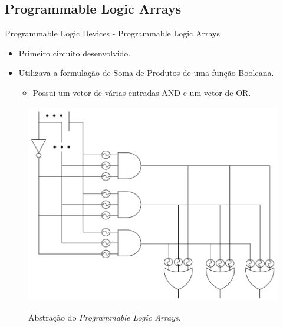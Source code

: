 \documentclass[aspectratio=169]{beamer}
\begin{document}
	\subsection{Programmable Logic Arrays}
	\begin{frame}{Programmable Logic Devices - Programmable Logic Arrays}
		\begin{itemize}
			\item Primeiro circuito desenvolvido.
			\item Utilizava a formulação de Soma de Produtos de uma função Booleana.
			\begin{itemize}
				\item Possui um vetor de várias entradas AND e um vetor de OR.
			\end{itemize}
		\end{itemize}
		
		
		\begin{figure}[h]
			\centering
			\caption{Abstração do \textit{Programmable Logic Arrays}.}
			\includegraphics[height=0.57\textheight]{img/print/pla.png}
			\label{fig:pla}
		\end{figure}
	\end{frame}
	
\end{document}
